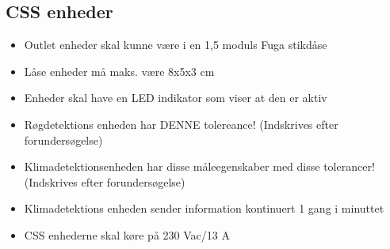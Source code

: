 \subsection*{CSS enheder}
\begin{itemize}
\item Outlet enheder skal kunne være i en 1,5 moduls Fuga stikdåse
\item Låse enheder må maks. være 8x5x3 cm
\item Enheder skal have en LED indikator som viser at den er aktiv
\item Røgdetektions enheden har DENNE tolereance! (Indskrives efter forundersøgelse)
\item Klimadetektionsenheden har disse måleegenskaber med disse tolerancer! (Indskrives efter forundersøgelse)
\item Klimadetektions enheden sender information kontinuert 1 gang i minuttet
\item CSS enhederne skal køre på 230 Vac/13 A
\end{itemize}
